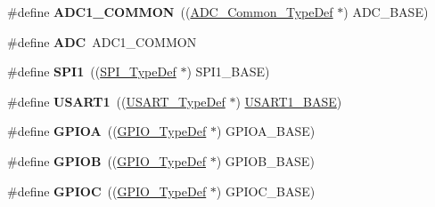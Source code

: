 \begin{DoxyCompactItemize}
\item 
\hypertarget{group___peripheral__declaration_gaf1919c64fc774aab31190346fd5457e2}{\#define {\bfseries A\-D\-C1\-\_\-\-C\-O\-M\-M\-O\-N}~((\hyperlink{struct_a_d_c___common___type_def}{A\-D\-C\-\_\-\-Common\-\_\-\-Type\-Def} $\ast$) A\-D\-C\-\_\-\-B\-A\-S\-E)}\label{group___peripheral__declaration_gaf1919c64fc774aab31190346fd5457e2}

\item 
\hypertarget{group___peripheral__declaration_ga54d148b91f3d356713f7e367a2243bea}{\#define {\bfseries A\-D\-C}~A\-D\-C1\-\_\-\-C\-O\-M\-M\-O\-N}\label{group___peripheral__declaration_ga54d148b91f3d356713f7e367a2243bea}

\item 
\hypertarget{group___peripheral__declaration_gad483be344a28ac800be8f03654a9612f}{\#define {\bfseries S\-P\-I1}~((\hyperlink{struct_s_p_i___type_def}{S\-P\-I\-\_\-\-Type\-Def} $\ast$) S\-P\-I1\-\_\-\-B\-A\-S\-E)}\label{group___peripheral__declaration_gad483be344a28ac800be8f03654a9612f}

\item 
\hypertarget{group___peripheral__declaration_ga92871691058ff7ccffd7635930cb08da}{\#define {\bfseries U\-S\-A\-R\-T1}~((\hyperlink{struct_u_s_a_r_t___type_def}{U\-S\-A\-R\-T\-\_\-\-Type\-Def} $\ast$) \hyperlink{group___peripheral__memory__map_ga86162ab3f740db9026c1320d46938b4d}{U\-S\-A\-R\-T1\-\_\-\-B\-A\-S\-E})}\label{group___peripheral__declaration_ga92871691058ff7ccffd7635930cb08da}

\item 
\hypertarget{group___peripheral__declaration_gac485358099728ddae050db37924dd6b7}{\#define {\bfseries G\-P\-I\-O\-A}~((\hyperlink{struct_g_p_i_o___type_def}{G\-P\-I\-O\-\_\-\-Type\-Def} $\ast$) G\-P\-I\-O\-A\-\_\-\-B\-A\-S\-E)}\label{group___peripheral__declaration_gac485358099728ddae050db37924dd6b7}

\item 
\hypertarget{group___peripheral__declaration_ga68b66ac73be4c836db878a42e1fea3cd}{\#define {\bfseries G\-P\-I\-O\-B}~((\hyperlink{struct_g_p_i_o___type_def}{G\-P\-I\-O\-\_\-\-Type\-Def} $\ast$) G\-P\-I\-O\-B\-\_\-\-B\-A\-S\-E)}\label{group___peripheral__declaration_ga68b66ac73be4c836db878a42e1fea3cd}

\item 
\hypertarget{group___peripheral__declaration_ga2dca03332d620196ba943bc2346eaa08}{\#define {\bfseries G\-P\-I\-O\-C}~((\hyperlink{struct_g_p_i_o___type_def}{G\-P\-I\-O\-\_\-\-Type\-Def} $\ast$) G\-P\-I\-O\-C\-\_\-\-B\-A\-S\-E)}\label{group___peripheral__declaration_ga2dca03332d620196ba943bc2346eaa08}


\end{DoxyCompactItemize}
